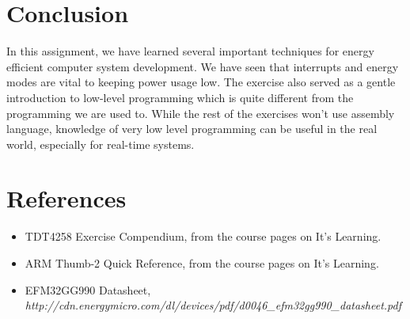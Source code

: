 \documentclass[a4paper, 12pt]{article}
\begin{document}
\section{Conclusion} %
\label{sec:conclusion}
    In this assignment, we have learned several important techniques for energy efficient computer system development. We have seen that interrupts and energy modes are vital to keeping power usage low. The exercise also served as a gentle introduction to low-level programming which is quite different from the programming we are used to. While the rest of the exercises won't use assembly language, knowledge of very low level programming can be useful in the real world, especially for real-time systems.

\section{References} %
\label{sec:references}
    \begin{itemize}
        \item TDT4258 Exercise Compendium, from the course pages on It's Learning.
        \item ARM Thumb-2 Quick Reference, from the course pages on It's Learning.
        \item EFM32GG990 Datasheet, \textit{http://cdn.energymicro.com/dl/devices/pdf/d0046\_efm32gg990\_datasheet.pdf}
    \end{itemize}
\end{document}
